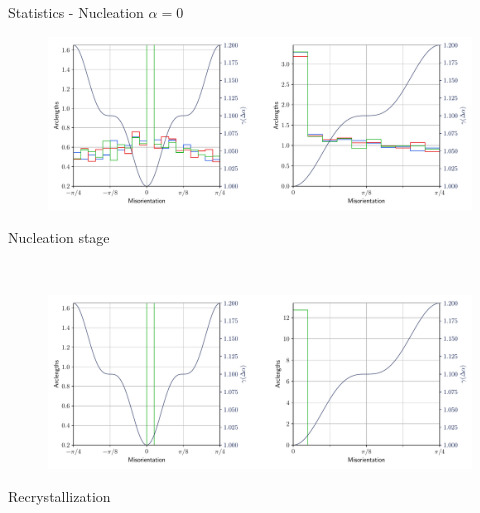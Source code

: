 \documentclass[usenames,dvipsnames]{beamer}
\begin{document}
\begin{frame}{Statistics - Nucleation $\alpha = 0$}
\small
    \begin{minipage}{\textwidth}
    \centering
    \vspace{-0.5em}
    \begin{figure}
    \centering
    \includegraphics[scale=0.33]{figures/stored_energy/SE/gbcd/000110_nuclconstant_set.pdf}
    \end{figure}
    \vspace{-2em}
    Nucleation stage
    \end{minipage}\\
    \begin{minipage}{\textwidth}
    \centering
    \begin{figure}
    \centering
    \includegraphics[scale=0.33]{figures/stored_energy/SE/gbcd/000240_nuclconstant_set.pdf}
    \end{figure}
    \vspace{-2em}
    Recrystallization
    \end{minipage}
\end{frame}
\end{document}
